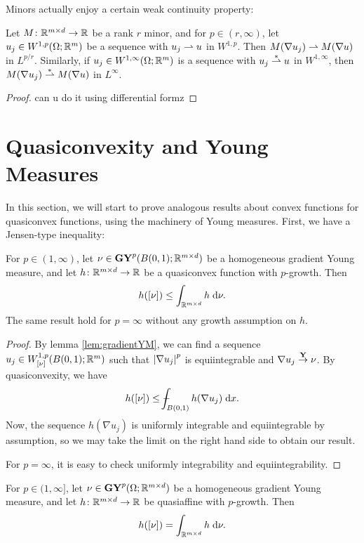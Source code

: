 Minors actually enjoy a certain weak continuity property:
\begin{lemma} \label{lem:minorWeakCty}
    Let $M \colon \mathbb{R}^{m \times d} \to \mathbb{R}$ be a rank $r$ minor, and for $p \in (r,\infty)$, let $u_j \in W^{1,p}(\Omega;\mathbb{R}^m)$ be a sequence with $u_j \rightharpoonup u$ in $W^{1,p}$. Then $M(\nabla u_j) \rightharpoonup M(\nabla u)$ in $L^{p/r}$. Similarly, if $u_j \in W^{1,\infty}(\Omega;\mathbb{R}^m)$ is a sequence with $u_j \overset{\ast}{\rightharpoonup} u$ in $W^{1,\infty}$, then $M(\nabla u_j) \overset{\ast}{\rightharpoonup} M(\nabla u)$ in $L^\infty$.
\end{lemma}
\begin{proof}
    {\color{red} can u do it using differential formz}
\end{proof}

\section{Quasiconvexity and Young Measures}
In this section, we will start to prove analogous results about convex functions for quasiconvex functions, using the machinery of Young measures. First, we have a Jensen-type inequality:
\begin{lemma} \label{lem:quasiconvexJensen}
    For $p \in (1,\infty)$, let $\nu \in \mathbf{GY}^p(B(0,1);\mathbb{R}^{m \times d})$ be a homogeneous gradient Young measure, and let $h \colon \mathbb{R}^{m \times d} \to \mathbb{R}$ be a quasiconvex function with $p$-growth. Then 
    \begin{equation}
        h([\nu]) \leq \int_{\mathbb{R}^{m \times d}} h \; \mathrm{d}\nu.
    \end{equation}
    The same result hold for $p=\infty$ without any growth assumption on $h$.
\end{lemma}
\begin{proof}
    By lemma \ref{lem:gradientYM}, we can find a sequence $u_j \in W^{1,p}_{[\nu]}(B(0,1);\mathbb{R}^m)$ such that $\left\lvert {\nabla u_j} \right\rvert^p$ is equiintegrable and $\nabla u_j \overset{\mathbf{Y}}{\rightarrow} \nu$. By quasiconvexity, we have 
    \begin{equation}
        h([\nu]) \leq \dashint_{B(0,1)} h(\nabla u_j) \; \d x.
    \end{equation}
    Now, the sequence $h(\nabla u_j)$ is uniformly integrable and equiintegrable by assumption, so we may take the limit on the right hand side to obtain our result.

   For $p=\infty$, it is easy to check uniformly integrability and equiintegrability.
\end{proof}
\begin{corollary}
    For $p \in (1,\infty]$, let $\nu \in \mathbf{GY}^p(\Omega;\mathbb{R}^{m \times d})$ be a homogeneous gradient Young measure, and let $h \colon \mathbb{R}^{m \times d} \to \mathbb{R}$ be quasiaffine with $p$-growth. Then 
    \begin{equation}
        h([\nu]) = \int_{\mathbb{R}^{m \times d}} h \; \mathrm{d}\nu.
    \end{equation}
\end{corollary}

